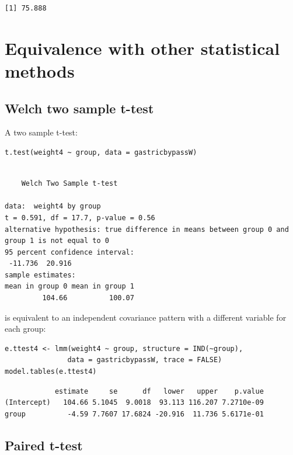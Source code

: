 \documentclass[12pt]{article}
\begin{document}
\begin{verbatim}
[1] 75.888
\end{verbatim}



\clearpage

\section{Equivalence with other statistical methods}
\label{sec:orgbc56f24}
\subsection{Welch two sample t-test}
\label{sec:org59ffd55}

A two sample t-test:
\lstset{language=r,label= ,caption= ,captionpos=b,numbers=none}
\begin{lstlisting}
t.test(weight4 ~ group, data = gastricbypassW)
\end{lstlisting}

\begin{verbatim}

	Welch Two Sample t-test

data:  weight4 by group
t = 0.591, df = 17.7, p-value = 0.56
alternative hypothesis: true difference in means between group 0 and group 1 is not equal to 0
95 percent confidence interval:
 -11.736  20.916
sample estimates:
mean in group 0 mean in group 1 
         104.66          100.07
\end{verbatim}

is equivalent to an independent covariance pattern with a different
variable for each group:
\lstset{language=r,label= ,caption= ,captionpos=b,numbers=none}
\begin{lstlisting}
e.ttest4 <- lmm(weight4 ~ group, structure = IND(~group), 
               data = gastricbypassW, trace = FALSE)
model.tables(e.ttest4)
\end{lstlisting}

\begin{verbatim}
            estimate     se      df   lower   upper    p.value
(Intercept)   104.66 5.1045  9.0018  93.113 116.207 7.2710e-09
group          -4.59 7.7607 17.6824 -20.916  11.736 5.6171e-01
\end{verbatim}


\clearpage

\subsection{Paired t-test}
\label{sec:org50923ca}
\end{document}
